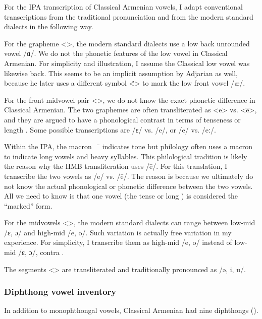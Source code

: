 \documentclass[output=paper]{langscibook}
\begin{document}
For the IPA transcription of Classical Armenian vowels, I adapt conventional transcriptions from the traditional pronunciation and from the modern standard dialects in the following way. 

\begin{sloppypar}
For the grapheme <>, the modern standard dialects use a low back unrounded vowel /ɑ/. We do not the phonetic features of the low vowel in Classical Armenian.   For simplicity and illustration, I assume the Classical low vowel was likewise back. This seems to be an implicit assumption by Adjarian as well, because he later uses a different symbol <̈> to mark the low front vowel /æ/. 
\end{sloppypar}

For the front midvowel pair <>, we do not know the exact phonetic difference in Classical Armenian. The two graphemes are often transliterated as <e> vs. <ē>, and they are argued to have a phonological contrast in terms of tenseness \citep[14]{Thomson-1989-IntroClassicalArmenian} or length \citep[6]{Godel-1975-IntroClassicalArmenian}. Some  possible transcriptions are /ɛ/ vs. /e/,  or /e/ vs. /eː/. 

Within the IPA, the macron  ~ ̄  indicates tone but philology often uses a macron to indicate long vowels and heavy syllables. This philological tradition is likely the reason why the HMB transliteration uses /ē/. For this translation,   I transcribe the two vowels as /e/ vs. /ē/. The reason is because we ultimately do not know the actual phonological or phonetic  difference between the two vowels. All we need to know is that one vowel (the tense or long ) is considered the ``marked'' form.


For the midvowels <>, the modern standard dialects can range between   low-mid /ɛ, ɔ/ and high-mid /e, o/. Such variation is actually free variation in my experience. For simplicity, I transcribe them as high-mid /e, o/ instead of low-mid /ɛ, ɔ/, contra \citet[1039]{Macak-2017-PhonoClassicalArmenian}. 

The segments <> are transliterated and traditionally pronounced as /ə, i, u/. 

\subsubsection{Diphthong vowel inventory}\label{sec:HossepIntro:phonotransc:Classical:Diphthong}
In addition to monophthongal vowels, Classical Armenian had nine diphthongs (). 
\end{document}
